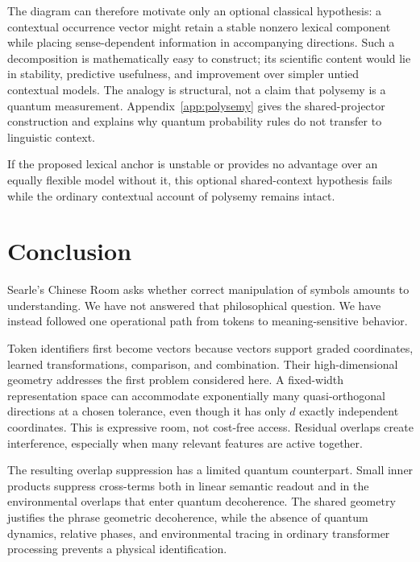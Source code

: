 \documentclass[
  aps,
  reprint,
  superscriptaddress,
  floatfix,
  nofootinbib,
  longbibliography
]{revtex4-2}
\begin{document}
The diagram can therefore motivate only an optional classical hypothesis: a
contextual occurrence vector might retain a stable nonzero lexical component
while placing sense-dependent information in accompanying directions.  Such a
decomposition is mathematically easy to construct; its scientific content
would lie in stability, predictive usefulness, and improvement over simpler
untied contextual models.  The analogy is structural, not a claim that
polysemy is a quantum measurement.  Appendix~\ref{app:polysemy} gives the
shared-projector construction and explains why quantum probability rules do
not transfer to linguistic context.

If the proposed lexical anchor is unstable or provides no advantage over an
equally flexible model without it, this optional shared-context hypothesis
fails while the ordinary contextual account of polysemy remains intact.

\section{Conclusion}
\label{sec:conclusion}

Searle's Chinese Room asks whether correct manipulation of symbols amounts to
understanding.  We have not answered that philosophical question.  We have
instead followed one operational path from tokens to meaning-sensitive
behavior.

Token identifiers first become vectors because vectors support graded
coordinates, learned transformations, comparison, and combination.  Their
high-dimensional geometry addresses the first problem considered here.  A
fixed-width representation space can accommodate exponentially many
quasi-orthogonal
directions at a chosen tolerance, even though it has only $d$ exactly
independent coordinates.  This is expressive room, not cost-free access.
Residual overlaps create interference, especially when many relevant features
are active together.

The resulting overlap suppression has a limited quantum counterpart.  Small
inner products suppress cross-terms both in linear semantic readout and in
the environmental overlaps that enter quantum decoherence.  The shared
geometry justifies the phrase geometric decoherence, while the absence of
quantum dynamics, relative phases, and environmental tracing in ordinary
transformer processing prevents a physical identification.
\end{document}
